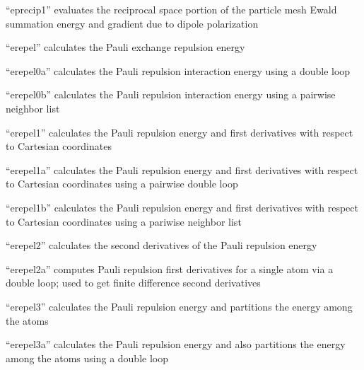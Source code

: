 \documentclass[letterpaper,11pt,english]{sphinxmanual}
\begin{document}

“eprecip1” evaluates the reciprocal space portion of the particle
mesh Ewald summation energy and gradient due to dipole polarization



“erepel” calculates the Pauli exchange repulsion energy


“erepel0a” calculates the Pauli repulsion interaction energy
using a double loop


“erepel0b” calculates the Pauli repulsion interaction energy
using a pairwise neighbor list


“erepel1” calculates the Pauli repulsion energy and first
derivatives with respect to Cartesian coordinates


“erepel1a” calculates the Pauli repulsion energy and first
derivatives with respect to Cartesian coordinates using a
pairwise double loop


“erepel1b” calculates the Pauli repulsion energy and first
derivatives with respect to Cartesian coordinates using a
pariwise neighbor list


“erepel2” calculates the second derivatives of the Pauli
repulsion energy


“erepel2a” computes Pauli repulsion first derivatives for a
single atom via a double loop; used to get finite difference
second derivatives


“erepel3” calculates the Pauli repulsion energy and partitions
the energy among the atoms


“erepel3a” calculates the Pauli repulsion energy and also
partitions the energy among the atoms using a double loop

\end{document}
